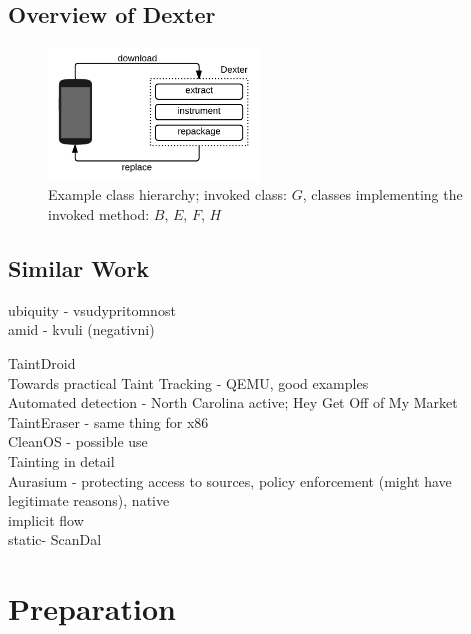 \documentclass[12pt,twoside,notitlepage]{report}
\begin{document}
\section{Overview of Dexter}

\begin{figure}
	\centerline{	
		\includegraphics[width=0.5\textwidth]{figs/fig_intro_overview.png}
	}
	\caption{Example class hierarchy; invoked class: $G$, classes implementing the invoked method: $B$, $E$, $F$, $H$}
	\label{fig:Introduction_Overview}
\end{figure}

\section{Similar Work}

ubiquity - vsudypritomnost \\
amid - kvuli (negativni)

TaintDroid \cite{Enck:2010:TIT:1924943.1924971} \\
Towards practical Taint Tracking - QEMU, good examples \cite{Ermolinskiy:EECS-2010-92} \\
Automated detection - North Carolina active; Hey Get Off of My Market \cite{Yajin:12NDSS} \cite{Grace:2012:RSA:2307636.2307663} \\
TaintEraser - same thing for x86 \cite{Zhu:2011:TPS:1945023.1945039} \\
CleanOS - possible use \cite{Tang:2012:CLM:2387880.2387888} \\
Tainting in detail \cite{Schwartz:2010:YEW:1849417.1849981} \\
Aurasium - protecting access to sources, policy enforcement (might have legitimate reasons), native \cite{Xu:2012:APP:2362793.2362820} \\
implicit flow \cite{Nair:2008:VMB:1346355.1346524} \\
static- ScanDal \cite{2012kim_scandal}
\cleardoublepage
\chapter{Preparation}
\end{document}
